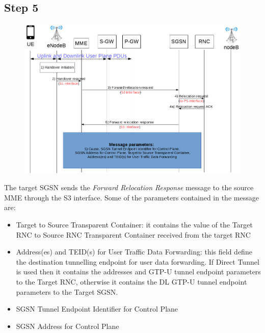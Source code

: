 


\subsection*{Step 5}
\begin{figure}[!htb]
	\centering
	\includegraphics[width=0.9\linewidth]{img/preparation-5.png}
	\label{fig:7}
\end{figure}
The target SGSN sends the \emph{Forward Relocation Response} message
to the source MME through the S3 interface. Some of the parameters contained in
the message are:
\begin{itemize}
 \item Target to Source Transparent Container: it contains the value of the
 Target RNC to Source RNC Transparent Container received from the target RNC
 \item Address(es) and TEID(s) for User Traffic Data Forwarding: this field
 define the destination tunnelling endpoint for user data forwarding. If Direct Tunnel
 is used then it contains the addresses and GTP-U tunnel endpoint parameters
 to the Target RNC, otherwise it contains the DL GTP-U tunnel endpoint parameters
 to the Target SGSN.
 \item SGSN Tunnel Endpoint Identifier for Control Plane
 \item SGSN Address for Control Plane
\end{itemize}



